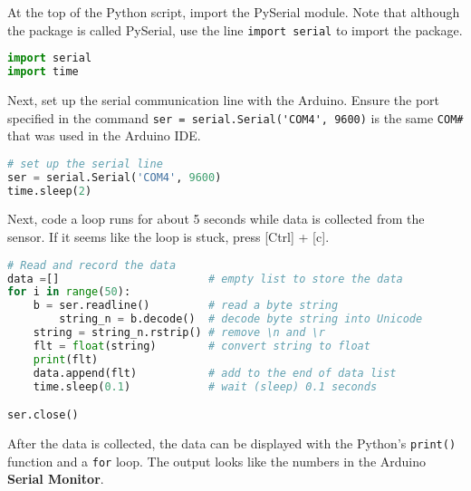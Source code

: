 \documentclass{book}
\newcommand{\passthrough}[1]{#1}
\begin{document}
At the top of the Python script, import the PySerial module. Note that
although the package is called PySerial, use the line
\passthrough{\lstinline!import serial!} to import the package.
    




    
        \begin{lstlisting}[language=Python]
import serial
import time
\end{lstlisting}
    




    
        Next, set up the serial communication line with the Arduino. Ensure the
port specified in the command
\passthrough{\lstinline!ser = serial.Serial('COM4', 9600)!} is the same
\passthrough{\lstinline!COM#!} that was used in the Arduino IDE.
    




    
        \begin{lstlisting}[language=Python]
# set up the serial line
ser = serial.Serial('COM4', 9600)
time.sleep(2)
\end{lstlisting}
    




    
        Next, code a loop runs for about 5 seconds while data is collected from
the sensor. If it seems like the loop is stuck, press {[}Ctrl{]} +
{[}c{]}.
    




    
        \begin{lstlisting}[language=Python]
# Read and record the data
data =[]                       # empty list to store the data
for i in range(50):
    b = ser.readline()         # read a byte string
        string_n = b.decode()  # decode byte string into Unicode  
    string = string_n.rstrip() # remove \n and \r
    flt = float(string)        # convert string to float
    print(flt)
    data.append(flt)           # add to the end of data list
    time.sleep(0.1)            # wait (sleep) 0.1 seconds

ser.close()
\end{lstlisting}
    




    
        After the data is collected, the data can be displayed with the Python's
\passthrough{\lstinline!print()!} function and a
\passthrough{\lstinline!for!} loop. The output looks like the numbers in
the Arduino \textbf{Serial Monitor}.
    
\end{document}
